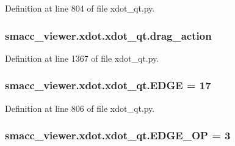Definition at line 804 of file xdot\+\_\+qt.\+py.

\subsubsection[{\texorpdfstring{drag\+\_\+action}{drag_action}}]{\setlength{\rightskip}{0pt plus 5cm}smacc\+\_\+viewer.\+xdot.\+xdot\+\_\+qt.\+drag\+\_\+action}\hypertarget{namespacesmacc__viewer_1_1xdot_1_1xdot__qt_aacf18e4b4f9d368501a082c11376c6a0}{}\label{namespacesmacc__viewer_1_1xdot_1_1xdot__qt_aacf18e4b4f9d368501a082c11376c6a0}


Definition at line 1367 of file xdot\+\_\+qt.\+py.

\subsubsection[{\texorpdfstring{E\+D\+GE}{EDGE}}]{ smacc\+\_\+viewer.\+xdot.\+xdot\+\_\+qt.\+E\+D\+GE = 17}\hypertarget{namespacesmacc__viewer_1_1xdot_1_1xdot__qt_ab75bc047150f1d866748d463de5ad4f3}{}\label{namespacesmacc__viewer_1_1xdot_1_1xdot__qt_ab75bc047150f1d866748d463de5ad4f3}


Definition at line 806 of file xdot\+\_\+qt.\+py.

\subsubsection[{\texorpdfstring{E\+D\+G\+E\+\_\+\+OP}{EDGE_OP}}]{ smacc\+\_\+viewer.\+xdot.\+xdot\+\_\+qt.\+E\+D\+G\+E\+\_\+\+OP = 3}\hypertarget{namespacesmacc__viewer_1_1xdot_1_1xdot__qt_af7416280dd42829da93d4e1713b5486c}{}\label{namespacesmacc__viewer_1_1xdot_1_1xdot__qt_af7416280dd42829da93d4e1713b5486c}


